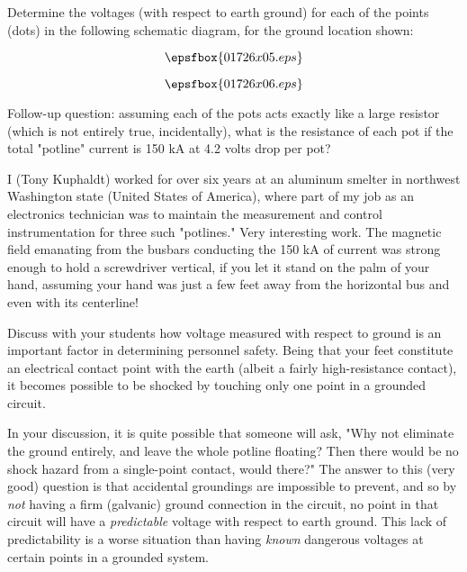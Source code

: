 Determine the voltages (with respect to earth ground) for each of the points (dots) in the following schematic diagram, for the ground location shown:

$$\epsfbox{01726x05.eps}$$







$$\epsfbox{01726x06.eps}$$

\vskip 10pt

Follow-up question: assuming each of the pots acts exactly like a large resistor (which is not entirely true, incidentally), what is the resistance of each pot if the total "potline" current is 150 kA at 4.2 volts drop per pot?







I (Tony Kuphaldt) worked for over six years at an aluminum smelter in northwest Washington state (United States of America), where part of my job as an electronics technician was to maintain the measurement and control instrumentation for three such "potlines."  Very interesting work.  The magnetic field emanating from the busbars conducting the 150 kA of current was strong enough to hold a screwdriver vertical, if you let it stand on the palm of your hand, assuming your hand was just a few feet away from the horizontal bus and even with its centerline!

Discuss with your students how voltage measured with respect to ground is an important factor in determining personnel safety.  Being that your feet constitute an electrical contact point with the earth (albeit a fairly high-resistance contact), it becomes possible to be shocked by touching only one point in a grounded circuit.

In your discussion, it is quite possible that someone will ask, "Why not eliminate the ground entirely, and leave the whole potline floating?  Then there would be no shock hazard from a single-point contact, would there?"  The answer to this (very good) question is that accidental groundings are impossible to prevent, and so by {\it not} having a firm (galvanic) ground connection in the circuit, no point in that circuit will have a {\it predictable} voltage with respect to earth ground.  This lack of predictability is a worse situation than having {\it known} dangerous voltages at certain points in a grounded system.




